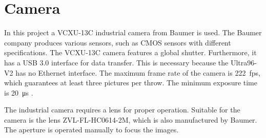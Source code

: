 \section{Camera}
\label{sec:hardware:camera}

In this project a VCXU-13C industrial camera from Baumer is used.
The Baumer company produces various sensors, such as CMOS sensors with different specifications.
The VCXU-13C camera features a global shutter.
Furthermore, it has a USB 3.0 interface for data transfer.
This is necessary because the Ultra96-V2 has no Ethernet interface.
The maximum frame rate of the camera is \SI{222}{fps}, which guarantees at least three pictures per throw.
The minimum exposure time is \SI{20}{\micro s} \cite{baumer_cam}.

The industrial camera requires a lens for proper operation.
Suitable for the camera is the lens ZVL-FL-HC0614-2M, which is also manufactured by Baumer.
The aperture is operated manually to focus the images.
